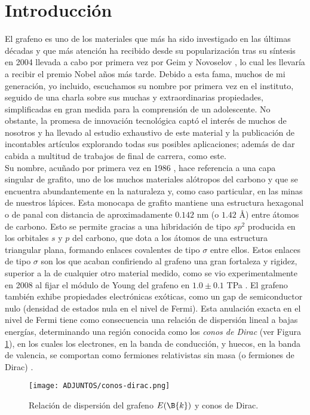 \section{Introducción}

El grafeno es uno de los materiales que más ha sido investigado en las últimas décadas y que más atención ha recibido desde su popularización tras su síntesis en 2004 llevada a cabo por primera vez por Geim y Novoselov \cite{science2004}, lo cual les llevaría a recibir el premio Nobel años más tarde. Debido a esta fama, muchos de mi generación, yo incluido, escuchamos su nombre por primera vez en el instituto, seguido de una charla sobre sus muchas y extraordinarias propiedades, simplificadas en gran medida para la comprensión de un adolescente. No obstante, la promesa de innovación tecnológica captó el interés de muchos de nosotros y ha llevado al estudio exhaustivo de este material y la publicación de incontables artículos explorando todas sus posibles aplicaciones; además de dar cabida a multitud de trabajos de final de carrera, como este. \\

Su nombre, acuñado por primera vez en 1986 \cite{BOEHM1986241}, hace referencia a una capa singular de grafito, uno de los muchos materiales alótropos del carbono y que se encuentra abundantemente en la naturaleza y, como caso particular, en las minas de nuestros lápices. Esta monocapa de grafito mantiene una estructura hexagonal o de panal con distancia de aproximadamente $0.142$ nm (o $1.42$ \AA) entre átomos de carbono. Esto se permite gracias a una hibridación de tipo $sp^2$ producida en los orbitales $s$ y $p$ del carbono, que dota a los átomos de una estructura triangular plana, formando enlaces covalentes de tipo $\sigma$ entre ellos. Estos enlaces de tipo $\sigma$ son los que acaban confiriendo al grafeno una gran fortaleza y rigidez, superior a la de cualquier otro material medido, como se vio experimentalmente en 2008 al fijar el módulo de Young del grafeno en $1.0 \pm 0.1 $ TPa \cite{science}. El grafeno también exhibe propiedades electrónicas exóticas, como un gap de semiconductor nulo (densidad de estados nula en el nivel de Fermi). Esta anulación exacta en el nivel de Fermi tiene como consecuencia una relación de dispersión lineal a bajas energías, determinando una región conocida como los \emph{conos de Dirac} (ver Figura \ref{fig:4.0}), en los cuales los electrones, en la banda de conducción, y huecos, en la banda de valencia, se comportan como fermiones relativistas sin masa (o fermiones de Dirac) \cite{castro-neto}. \\
\vspace{-.5cm}
\begin{figure}[!h]
    \centering
    \texttt{[image: ADJUNTOS/conos-dirac.png]}
    \caption{Relación de dispersión del grafeno $E(\B{k})$ y conos de Dirac. }
    \label{fig:4.0}
\end{figure}

